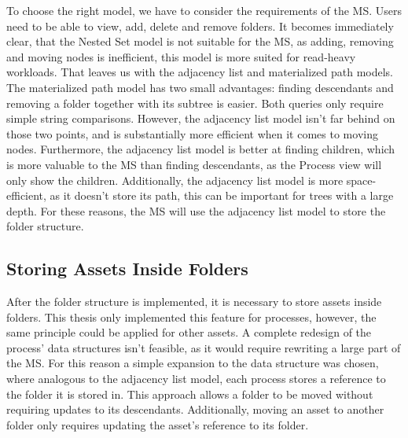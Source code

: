 To choose the right model, we have to consider the requirements of the MS.
Users need to be able to view, add, delete and remove folders.
It becomes immediately clear, that the Nested Set model is not suitable for the MS, as
adding, removing and moving nodes is inefficient, this model is more suited for read-heavy
workloads.
That leaves us with the adjacency list and materialized path models.
%
The materialized path model has two small advantages: finding descendants and removing a
folder together with its subtree is easier.
Both queries only require simple string comparisons.
%
%
However, the adjacency list model isn't far behind on those two points, and is
substantially more efficient when it comes to moving nodes.
Furthermore, the adjacency list model is better at finding children, which is more
valuable to the MS than finding descendants, as the Process view will only show the
children.
Additionally, the adjacency list model is more space-efficient, as it doesn't store its
path, this can be important for trees with a large depth.
For these reasons, the MS will use the adjacency list model to store the folder structure.

\subsection{Storing Assets Inside Folders}

After the folder structure is implemented, it is necessary to store assets inside
folders.
This thesis only implemented this feature for processes, however, the same principle could
be applied for other assets.
A complete redesign of the process' data structures isn't feasible, as it would require
rewriting a large part of the MS.
For this reason a simple expansion to the data structure was chosen, where analogous to
the adjacency list model, each process stores a reference to the folder it is stored in.
This approach allows a folder to be moved without requiring updates to its descendants.
Additionally, moving an asset to another folder only requires updating the asset's
reference to its folder.


